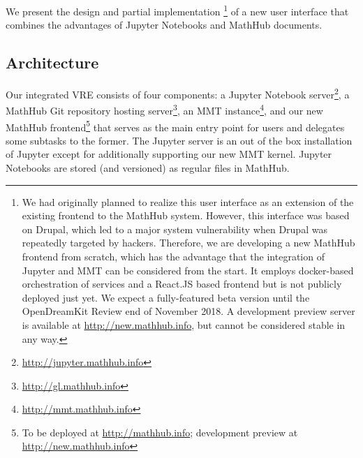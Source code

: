 We present the design and partial implementation%
\footnote{We had originally planned to realize this user interface as an extension of the existing frontend to the MathHub system.
However, this interface was based on Drupal, which led to a major system vulnerability when Drupal was repeatedly targeted by hackers.
Therefore, we are developing a new MathHub frontend from scratch, which has the advantage that the integration of Jupyter and MMT can be considered from the start.
It employs docker-based orchestration of services and a React.JS based frontend but is not publicly deployed just yet. We expect a fully-featured beta version until the OpenDreamKit Review end of November 2018. A development preview server is available at \url{http://new.mathhub.info}, but cannot be considered stable in any way.}
of a new user interface that combines the advantages of Jupyter Notebooks and MathHub documents.

\subsection{Architecture}

Our integrated VRE consists of four components: a Jupyter Notebook server\footnote{\url{http://jupyter.mathhub.info}}, a MathHub Git repository hosting server\footnote{\url{http://gl.mathhub.info}}, an MMT instance\footnote{\url{http://mmt.mathhub.info}}, and our new MathHub frontend\footnote{To be deployed at \url{http://mathhub.info}; development preview at \url{http://new.mathhub.info}} that serves as the main entry point for users and delegates some subtasks to the former.
The Jupyter server is an out of the box installation of Jupyter except for additionally supporting our new MMT kernel.
Jupyter Notebooks are stored (and versioned) as regular files in MathHub.

